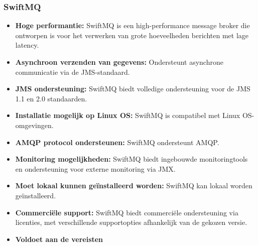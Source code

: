\subsubsection{SwiftMQ}
\begin{itemize}
    \item \textbf{Hoge performantie:} SwiftMQ is een high-performance message broker die ontworpen is voor het verwerken van grote hoeveelheden berichten met lage latency.
    \item \textbf{Asynchroon verzenden van gegevens:} Ondersteunt asynchrone communicatie via de JMS-standaard.
    \item \textbf{JMS ondersteuning:} SwiftMQ biedt volledige ondersteuning voor de JMS 1.1 en 2.0 standaarden.
    \item \textbf{Installatie mogelijk op Linux OS:} SwiftMQ is compatibel met Linux OS-omgevingen.
    \item \textbf{AMQP protocol ondersteunen:} SwiftMQ ondersteunt AMQP.
    \item \textbf{Monitoring mogelijkheden:} SwiftMQ biedt ingebouwde monitoringtools en ondersteuning voor externe monitoring via JMX.
    \item \textbf{Moet lokaal kunnen geïnstalleerd worden:} SwiftMQ kan lokaal worden geïnstalleerd.
    \item \textbf{Commerciële support:} SwiftMQ biedt commerciële ondersteuning via licenties, met verschillende supportopties afhankelijk van de gekozen versie.
    \item \textbf{Voldoet aan de vereisten}
\end{itemize}

